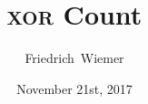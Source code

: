 \documentclass[12pt,mathserif,professionalfont]{beamer}
\title{\textsc{xor} Count}
\subtitle{}
\author[Friedrich~Wiemer]{Friedrich~Wiemer}
\institute{%
    FluxFingers\\[0.5em]
    Workgroup Symmetric Cryptography\\
    Ruhr University Bochum
}
\date{November 21st, 2017}
\begin{document}
\begin{frame}
    \titlepage{}
\end{frame}



\end{document}
